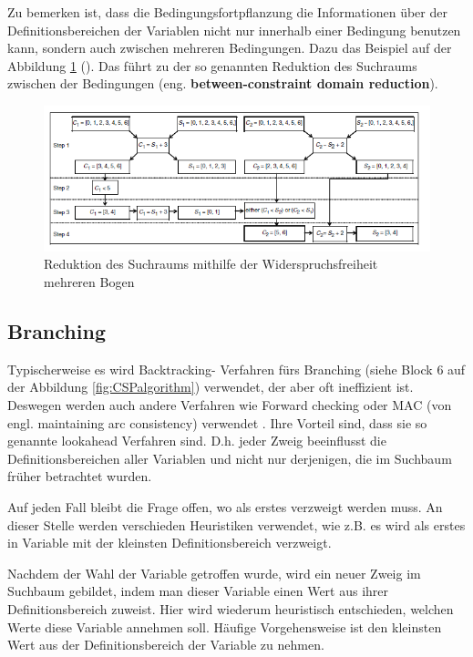Zu bemerken ist, dass die Bedingungsfortpflanzung die Informationen über der Definitionsbereichen der Variablen nicht nur innerhalb einer Bedingung benutzen kann, sondern auch zwischen mehreren Bedingungen. Dazu das Beispiel auf der Abbildung \ref{fig:ConstraintPropagation2} (\cite{CPforScheduling}). Das führt zu der so genannten Reduktion des Suchraums zwischen der Bedingungen (eng. {\bf between-constraint domain reduction}).

\begin{figure}[h]
	\centering
	\includegraphics[scale=0.8]{fig/ConstraintPropagation2.png}
	\caption{Reduktion des Suchraums mithilfe der Widerspruchsfreiheit mehreren Bogen}
	\label{fig:ConstraintPropagation2}
\end{figure}

\subsection{Branching}

Typischerweise es wird Backtracking- Verfahren fürs Branching (siehe Block $6$ auf der Abbildung \ref{fig:CSPalgorithm}) verwendet, der aber oft ineffizient ist. Deswegen werden auch andere Verfahren wie Forward checking oder MAC (von engl. maintaining arc consistency) verwendet \citep[vgl.][]{CSP}. Ihre Vorteil sind, dass sie so genannte lookahead Verfahren sind. D.h. jeder Zweig beeinflusst die Definitionsbereichen aller Variablen und nicht nur derjenigen, die im Suchbaum früher betrachtet wurden.

Auf jeden Fall bleibt die Frage offen, wo als erstes verzweigt werden muss. An dieser Stelle werden verschieden Heuristiken verwendet, wie z.B. es wird als erstes in Variable mit der kleinsten Definitionsbereich verzweigt.

Nachdem der Wahl der Variable getroffen wurde, wird ein neuer Zweig im Suchbaum gebildet, indem man dieser Variable einen Wert aus ihrer Definitionsbereich zuweist. Hier wird wiederum heuristisch entschieden, welchen Werte diese Variable annehmen soll. Häufige Vorgehensweise ist den kleinsten Wert aus der Definitionsbereich der Variable zu nehmen.

